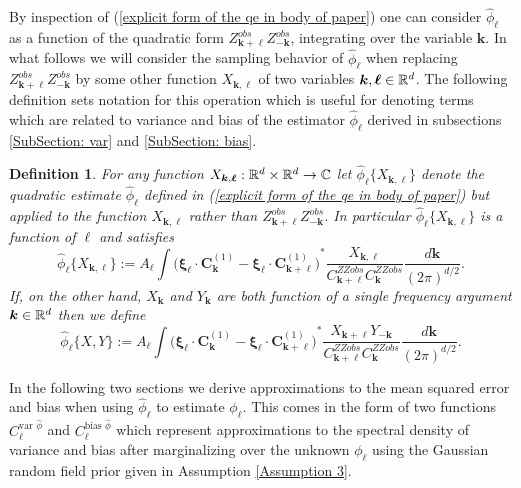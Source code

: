 \documentclass[10pt,noinfoline]{imsart}
\newtheorem{definition}{Definition}
\newcommand{\bs}{\boldsymbol}
\begin{document}
By inspection of (\ref{explicit form of the qe in body of paper}) one can consider $\hat\phi_{\bs \ell}$ as a function of the quadratic form  $Z^{obs}_{\bs k+\bs \ell}Z^{obs}_{-\bs k}$, integrating over the variable $\bs k$. In what follows we will consider the sampling behavior of $\hat\phi_{\bs \ell}$ when replacing $Z^{obs}_{\bs k+\bs \ell}Z^{obs}_{-\bs k}$ by some other function $X_{\bs k, \bs \ell}$ of two variables $\bs k,\bs\ell\in \Bbb R^d$. The following definition sets notation for this operation which is useful for denoting terms which are related to variance and bias of the estimator $\hat\phi_{\bs \ell}$ derived in subsections \ref{SubSection: var} and \ref{SubSection: bias}.

\begin{definition}
\label{def: quad est applied to X}
For any function $X_{\bs k, \bs \ell}:\Bbb R^d\times \Bbb R^d \rightarrow \Bbb C$ let
$\hat\phi_{\bs \ell}\{X_{\bs k,\bs \ell}\}$ denote the quadratic estimate $\hat\phi_{\bs \ell}$ defined in (\ref{explicit form of the qe in body of paper}) but applied to the function $X_{\bs k, \bs \ell}$ rather than $Z^{obs}_{\bs k+\bs \ell}Z^{obs}_{-\bs k}$. In particular $\hat\phi_{\bs \ell}\{X_{\bs k,\bs \ell}\}$ is a function of $\bs \ell$  and satisfies
\[
\hat\phi_{\bs \ell}\{X_{\bs k,\bs \ell}\}
:=A_{\bs \ell}
        \int
        {\Big(\bs\xi_{\bs \ell} \!\cdot\!\bs C^{{(1)}}_{\bs k} - \bs\xi_{\bs \ell} \!\cdot\!\bs C^{{(1)}}_{\bs k+\bs \ell}\Big)}^{\! *}
        \frac{X_{\bs k,\bs \ell}}{C^{ZZobs}_{\bs k+\bs \ell}C^{ZZobs}_{\bs k}}\frac{d\bs k}{{(2\pi)}^{d/2}}.
\]
If, on the other hand, $X_{\bs k}$ and $Y_{\bs k}$ are both function of a single frequency argument $\bs k\in \Bbb R^d$ then  we define
\[
\hat\phi_{\bs \ell}\{X,\!Y\}
:=A_{\bs \ell}
        \int
        {\Big(\bs\xi_{\bs \ell} \!\cdot\!\bs C^{{(1)}}_{\bs k} - \bs\xi_{\bs \ell} \!\cdot\!\bs C^{{(1)}}_{\bs k+\bs \ell}\Big)}^{\! *}
        \frac{X_{\bs k+\bs \ell}Y_{-\bs k}}{C^{ZZobs}_{\bs k+\bs \ell}C^{ZZobs}_{\bs k}}\frac{d\bs k}{{(2\pi)}^{d/2}}.
\]
\end{definition}



In the following two sections we derive approximations to the mean squared error and bias when using $\hat\phi_{\bs \ell}$ to estimate $\phi_{\bs \ell}$. This comes in the form of two functions $C_{\bs \ell}^{\text{var }\hat\phi}$ and $C_{\bs \ell}^{\text{bias }\hat\phi}$ which represent approximations to the spectral density of variance and bias after marginalizing over the unknown $\phi_{\bs \ell}$ using the Gaussian random field prior given in Assumption \ref{Assumption 3}.
\end{document}
